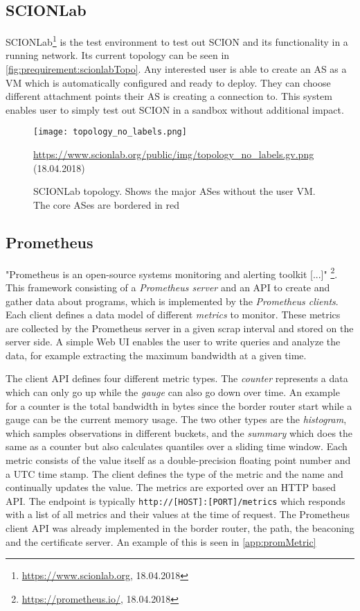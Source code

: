 \documentclass[thesis.tex]{subfiles}
\begin{document}
\subsection{SCIONLab}

SCIONLab\footnote{\url{https://www.scionlab.org}, 18.04.2018} is the test environment to test out SCION and its functionality in a running network. Its current topology can be seen in \autoref{fig:prequirement:scionlabTopo}. Any interested user is able to create an AS as a VM which is automatically configured and ready to deploy. They can choose different attachment points their AS is creating a connection to. This system enables user to simply test out SCION in a sandbox without additional impact.

\begin{figure}
	\centering
	\texttt{[image: topology\_no\_labels.png]}
	\caption*{\tiny{\url{https://www.scionlab.org/public/img/topology_no_labels.gv.png} (18.04.2018)}}
	\caption{SCIONLab topology. Shows the major ASes without the user VM. The core ASes are bordered in red}
	\label{fig:prequirement:scionlabTopo}
\end{figure}

\subsection{Prometheus} 

"Prometheus is an open-source systems monitoring and alerting toolkit [...]" \footnote{\url{https://prometheus.io/}, 18.04.2018}. This framework consisting of a \textit{Prometheus server} and an API to create and gather data about programs, which is implemented by the \textit{Prometheus clients}. Each client defines a data model of different \textit{metrics} to monitor. These metrics are collected by the Prometheus server in a given scrap interval and stored on the server side. A simple Web UI enables the user to write queries and analyze the data, for example extracting the maximum bandwidth at a given time.

The client API defines four different metric types. The \textit{counter} represents a data which can only go up while the \textit{gauge} can also go down over time. An example for a counter is the total bandwidth in bytes since the border router start while a gauge can be the current memory usage. The two other types are the \textit{histogram}, which samples observations in different buckets, and the \textit{summary} which does the same as a counter but also calculates quantiles over a sliding time window. Each metric consists of the value itself as a double-precision floating point number and a UTC time stamp. The client defines the type of the metric and the name and continually updates the value. The metrics are exported over an HTTP based API. The endpoint is typically {\lstinline|http://[HOST]:[PORT]/metrics|} which responds with a list of all metrics and their values at the time of request. The Prometheus client API was already implemented in the border router, the path, the beaconing and the certificate server. An example of this is seen in \autoref{app:promMetric}
\end{document}
